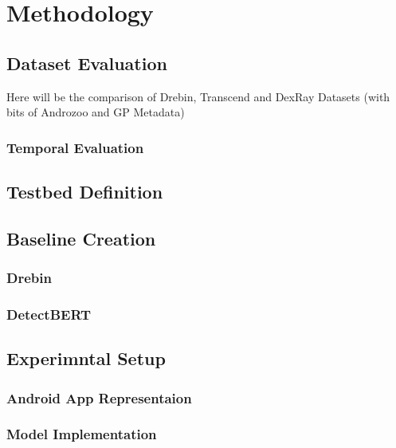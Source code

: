 \chapter{Methodology} %

\label{Methodology} %


\section{Dataset Evaluation}

Here will be the comparison of Drebin, Transcend and DexRay Datasets (with bits of Androzoo and GP Metadata)

\subsection{Temporal Evaluation}

\section{Testbed Definition}

\section{Baseline Creation}

\subsection{Drebin}

\subsection{DetectBERT}

\section{Experimntal Setup}

\subsection{Android App Representaion}

\subsection{Model Implementation}

